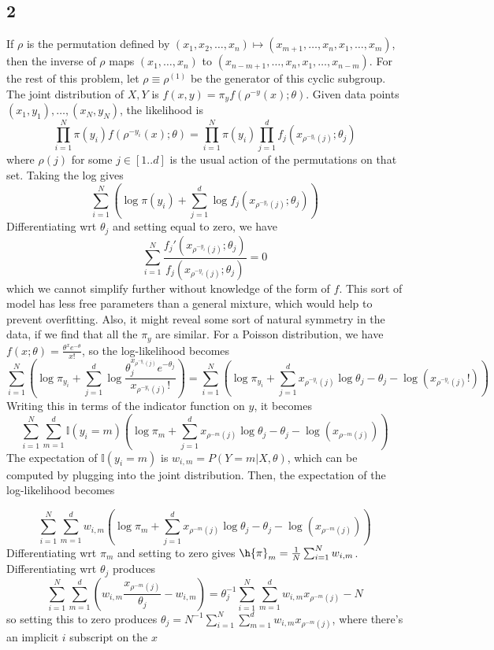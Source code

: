 \documentclass{article}
\begin{document}
\subsection*{2}
If $\rho$ is the permutation defined by $(x_1,x_2,\ldots,x_n)\mapsto(x_{m+1},\ldots,x_n,x_1,\ldots,x_m)$, then the inverse of $\rho$ maps $(x_1,\ldots,x_n)$ to $(x_{n-m+1},\ldots,x_n,x_1,\ldots,x_{n-m})$. For the rest of this problem, let $\rho\equiv\rho^{(1)}$ be the generator of this cyclic subgroup.
The joint distribution of $X,Y$ is $f(x,y)=\pi_yf(\rho^{-y}(x);\theta)$. Given data points $(x_1,y_1),\ldots,(x_N,y_N)$, the likelihood is
\[\prod_{i=1}^N\pi(y_i)f(\rho^{-y_i}(x);\theta)=\prod_{i=1}^N\pi(y_i)\prod_{j=1}^df_j(x_{\rho^{-y_i}(j)};\theta_j)\]
where $\rho(j)$ for some $j\in[1..d]$ is the usual action of the permutations on that set. Taking the log gives
\[\sum_{i=1}^N\left(\log\pi(y_i)+\sum_{j=1}^d\log f_j(x_{\rho^{-y_i}(j)};\theta_j)\right)\]
Differentiating wrt $\theta_j$ and setting equal to zero, we have
\[\sum_{i=1}^N\frac{f_j'(x_{\rho^{-y_i}(j)};\theta_j)}{f_j(x_{\rho^{-y_i}(j)};\theta_j)}=0\]
which we cannot simplify further without knowledge of the form of $f$.
This sort of model has less free parameters than a general mixture, which would help to prevent overfitting. Also, it might reveal some sort of natural symmetry in the data, if we find that all the $\pi_y$ are similar.
For a Poisson distribution, we have $f(x;\theta)=\frac{\theta^xe^{-\theta}}{x!}$, so the log-likelihood becomes
\[\sum_{i=1}^N\left(\log\pi_{y_i}+\sum_{j=1}^d\log \frac{\theta_j^{x_{\rho^{-y_i}(j)}}e^{-\theta_j}}{x_{\rho^{-y_i}(j)}!}\right)
=\sum_{i=1}^N\left(\log\pi_{y_i}+\sum_{j=1}^dx_{\rho^{-y_i}(j)}\log\theta_j-\theta_j-\log(x_{\rho^{-y_i}(j)}!)\right)\]
Writing this in terms of the indicator function on $y$, it becomes
\[\sum_{i=1}^N\sum_{m=1}^d\mathbb{I}(y_i=m)\left(\log\pi_m+\sum_{j=1}^dx_{\rho^{-m}(j)}\log\theta_j-\theta_j-\log(x_{\rho^{-m}(j)})\right)\]
The expectation of $\mathbb{I}(y_i=m)$ is $w_{i,m}=P(Y=m|X,\theta)$, which can be computed by plugging into the joint distribution. Then, the expectation of the log-likelihood becomes

\[\sum_{i=1}^N\sum_{m=1}^dw_{i,m}\left(\log\pi_m+\sum_{j=1}^dx_{\rho^{-m}(j)}\log\theta_j-\theta_j-\log(x_{\rho^{-m}(j)})\right)\]
Differentiating wrt $\pi_m$ and setting to zero gives $\h{\pi}_m=\frac{1}{N}\sum_{i=1}^Nw_{i,m}$. Differentiating wrt $\theta_j$ produces
\[\sum_{i=1}^N\sum_{m=1}^d\left(w_{i,m}\frac{x_{\rho^{-m}(j)}}{\theta_j}-w_{i,m}\right)=\theta_j^{-1}\sum_{i=1}^N\sum_{m=1}^dw_{i,m}x_{\rho^{-m}(j)}-N\]
so setting this to zero produces $\theta_j=N^{-1}\sum_{i=1}^N\sum_{m=1}^dw_{i,m}x_{\rho^{-m}(j)}$, where there's an implicit $i$ subscript on the $x$
\end{document}
